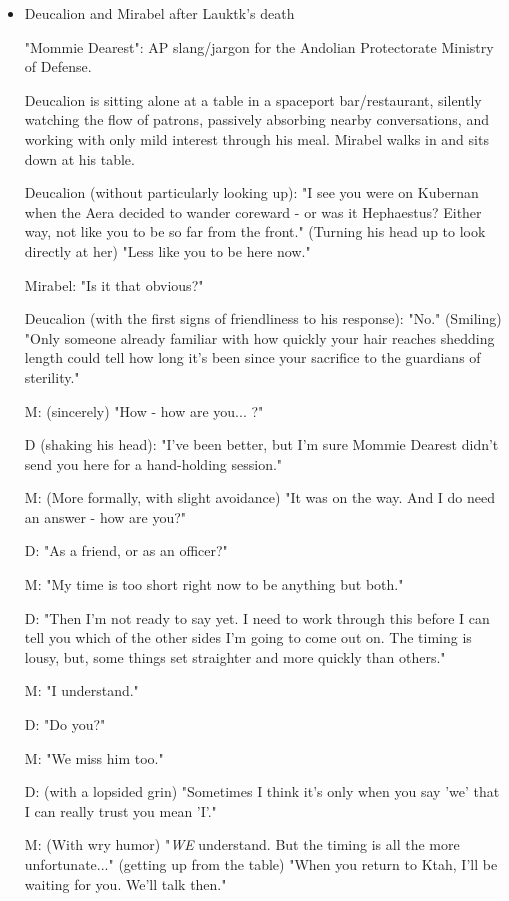 \begin{itemize}
\item Deucalion and Mirabel after Lauktk's death

"Mommie Dearest": AP slang/jargon for the Andolian Protectorate Ministry of Defense.

Deucalion is sitting alone at a table in a spaceport bar/restaurant,
silently watching the flow of patrons, passively absorbing nearby
conversations, and working with only mild interest through his
meal. Mirabel walks in and sits down at his table.

Deucalion (without particularly looking up): "I see you were on
Kubernan when the Aera decided to wander coreward - or was it
Hephaestus? Either way, not like you to be so far from the front."
(Turning his head up to look directly at her) "Less like you to be
here now."

Mirabel: "Is it that obvious?"

Deucalion (with the first signs of friendliness to his response):
"No." (Smiling) "Only someone already familiar with how quickly your
hair reaches shedding length could tell how long it's been since your
sacrifice to the guardians of sterility."

M: (sincerely) "How - how are you... ?"

D (shaking his head): "I've been better, but I'm sure Mommie Dearest
didn't send you here for a hand-holding session."

M: (More formally, with slight avoidance) "It was on the way. And I do need an answer - how are you?"

D: "As a friend, or as an officer?"

M: "My time is too short right now to be anything but both."

D: "Then I'm not ready to say yet. I need to work through this before
I can tell you which of the other sides I'm going to come out on. The
timing is lousy, but, some things set straighter and more quickly than
others."

M: "I understand."

D: "Do you?"

M: "We miss him too."

D: (with a lopsided grin) "Sometimes I think it's only when you say 'we' that I can really trust you mean 'I'."

M: (With wry humor) "{\em WE} understand. But the timing is all the more unfortunate..." (getting up from the table) "When you return to Ktah, I'll be waiting for you. We'll talk then."


\end{itemize}

